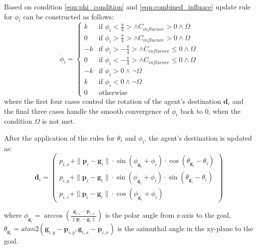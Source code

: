         Based on condition \eqref{eqn:phi_condition} and \eqref{eqn:combined_influace} update rule for $\phi_i$ can be constructed as follows:
        \begin{equation}
            \label{eqn:phi_update}
            \dot{\phi}_i = 
            \begin{cases}
                k  & \text{if } \phi_i < \frac{\pi}{4} > \land C_{influence} > 0 \land \Omega \\
                0  & \text{if } \phi_i > \frac{\pi}{4} > \land C_{influence} > 0 \land \Omega \\
                -k & \text{if } \phi_i > -\frac{\pi}{4} > \land C_{influence} \leq 0 \land \Omega \\
                0  & \text{if } \phi_i < -\frac{\pi}{4} > \land C_{influence} \leq 0 \land \Omega \\
                -k & \text{if } \phi_i > 0 \land \neg \Omega \\
                k  & \text{if } \phi_i < 0 \land \neg \Omega \\
                0  & \text{otherwise}
            \end{cases}
        \end{equation}
        where the first four cases control the rotation of the agent's destination $\mathbf{d}_i$ and the final three cases handle the smooth convergence of $\phi_i$ back to 0, when the condition $\Omega$ is not met. 

        After the application of the rules for $\theta_i$ and $\phi_i$, the agent's destination is updated as:
        \begin{equation}
            \label{eqn:destination_update}
            \mathbf{d}_i =
            \begin{pmatrix}
                p_{i,x} +  \|\mathbf{p}_i - \mathbf{g}_i\| \cdot \sin(\phi_{\mathbf{g}_i} + \phi_i) \cdot \cos(\theta_{\mathbf{g}_i} - \theta_i) \\
                p_{i,y} + \|\mathbf{p}_i - \mathbf{g}_i\| \cdot \sin(\phi_{\mathbf{g}_i} + \phi_i) \cdot \sin(\theta_{\mathbf{g}_i} - \theta_i) \\
                p_{i,z} + \|\mathbf{p}_i - \mathbf{g}_i\| \cdot \cos(\phi_{\mathbf{g}_i} + \phi_i)
            \end{pmatrix}
        \end{equation}

        where $\phi_{\mathbf{g}_i} = \arccos(\frac{\mathbf{g}_{i,z} - \mathbf{p}_{i,z}}{\|\mathbf{p}_i - \mathbf{g}_i\|})$ is the polar angle from z-axis to the goal, 
        $\theta_{\mathbf{g}_i} = atan2( \mathbf{g}_{i,y} - \mathbf{p}_{i,y}, \mathbf{g}_{i,x} - \mathbf{p}_{i,x})$ is the azimuthal angle in the xy-plane to the goal.
    
